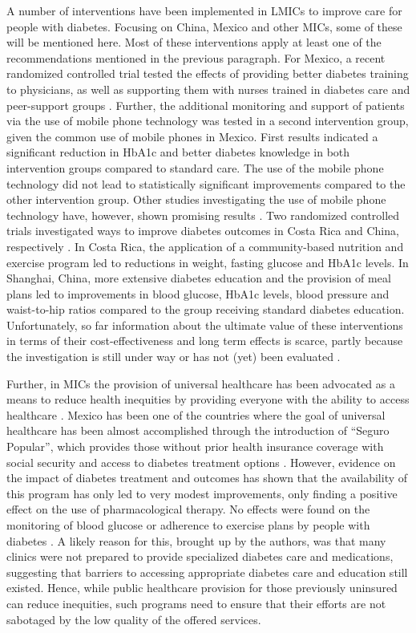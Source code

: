 A number of interventions have been implemented in \acp{LMIC} to improve care for people with diabetes. Focusing on China, Mexico and other \acp{MIC}, some of these will be mentioned here. Most of these interventions apply at least one of the recommendations mentioned in the previous paragraph. For Mexico, a recent randomized controlled trial tested the effects of providing better diabetes training to physicians, as well as supporting them with nurses trained in diabetes care and peer-support groups \parencite{Contreras2016}. Further, the additional monitoring and support of patients via the use of mobile phone technology was tested in a second intervention group, given the common use of mobile phones in Mexico. First results indicated a significant reduction in \ac{HbA1c} and better diabetes knowledge in both intervention groups compared to standard care. The use of the mobile phone technology did not lead to statistically significant improvements compared to the other intervention group. Other studies investigating the use of mobile phone technology have, however, shown promising results \parencite{Singh2016}. Two randomized controlled trials investigated ways to improve diabetes outcomes in Costa Rica and China, respectively \parencite{Goldhaber-Fiebert2003a,Sun2008}. In Costa Rica, the application of a community-based nutrition and exercise program led to reductions in weight, fasting glucose and \ac{HbA1c} levels. In Shanghai, China, more extensive diabetes education and the provision of meal plans led to improvements in blood glucose, \ac{HbA1c} levels, blood pressure and waist-to-hip ratios compared to the group receiving standard diabetes education.  Unfortunately, so far information about the ultimate value of these interventions in terms of their cost-effectiveness and long term effects is scarce, partly because the investigation is still under way \parencite{Contreras2016} or has not (yet) been evaluated \parencite{Singh2016}.

Further, in \acp{MIC} the provision of universal healthcare has been advocated as a means to reduce health inequities by providing everyone with the ability to access healthcare \parencite{Marmot2008}.  Mexico has been one of the countries where the goal of universal healthcare has been almost accomplished through the introduction of ``Seguro Popular'', which provides those without prior health insurance coverage with social security and access to diabetes treatment options \parencite{Knaul2012,Rivera-Hernandez2016}. However, evidence on the impact of diabetes treatment and outcomes has shown that the availability of this program has only led to very modest improvements, only finding a positive effect on the use of pharmacological therapy. No effects were found on the monitoring of blood glucose or adherence to exercise plans by people with diabetes \parencite{Rivera-Hernandez2016}. A likely reason for this, brought up by the authors, was that many clinics were not prepared to provide specialized diabetes care and medications, suggesting that barriers to accessing appropriate diabetes care and education still existed. Hence, while public healthcare provision for those previously uninsured can reduce inequities, such programs need to ensure that their efforts are not sabotaged by the low quality of the offered services.


